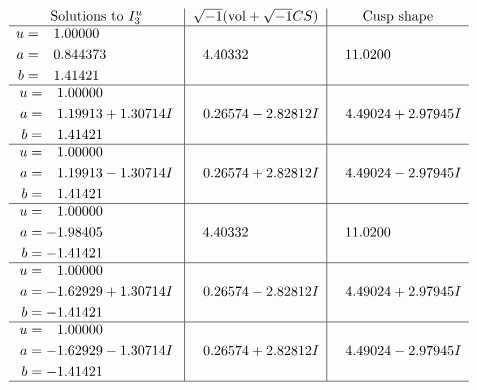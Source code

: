 \documentclass[1p]{elsarticle_modified}
\theoremstyle{definition}
\newcommand{\I}{\sqrt{-1}}
\begin{document}
$$\begin{array}{c|c|c}  
\text{Solutions to }I^u_{3}& \I (\text{vol} + \sqrt{-1}CS) & \text{Cusp shape}\\
 \hline 
\begin{aligned}
u &= \phantom{-}1.00000\phantom{ +0.000000I} \\
a &= \phantom{-}0.844373\phantom{ +0.000000I} \\
b &= \phantom{-}1.41421\phantom{ +0.000000I}\end{aligned}
 & \phantom{-}4.40332\phantom{ +0.000000I} & \phantom{-}11.0200\phantom{ +0.000000I} \\ \hline\begin{aligned}
u &= \phantom{-}1.00000\phantom{ +0.000000I} \\
a &= \phantom{-}1.19913 + 1.30714 I \\
b &= \phantom{-}1.41421\phantom{ +0.000000I}\end{aligned}
 & \phantom{-}0.26574 - 2.82812 I & \phantom{-}4.49024 + 2.97945 I \\ \hline\begin{aligned}
u &= \phantom{-}1.00000\phantom{ +0.000000I} \\
a &= \phantom{-}1.19913 - 1.30714 I \\
b &= \phantom{-}1.41421\phantom{ +0.000000I}\end{aligned}
 & \phantom{-}0.26574 + 2.82812 I & \phantom{-}4.49024 - 2.97945 I \\ \hline\begin{aligned}
u &= \phantom{-}1.00000\phantom{ +0.000000I} \\
a &= -1.98405\phantom{ +0.000000I} \\
b &= -1.41421\phantom{ +0.000000I}\end{aligned}
 & \phantom{-}4.40332\phantom{ +0.000000I} & \phantom{-}11.0200\phantom{ +0.000000I} \\ \hline\begin{aligned}
u &= \phantom{-}1.00000\phantom{ +0.000000I} \\
a &= -1.62929 + 1.30714 I \\
b &= -1.41421\phantom{ +0.000000I}\end{aligned}
 & \phantom{-}0.26574 - 2.82812 I & \phantom{-}4.49024 + 2.97945 I \\ \hline\begin{aligned}
u &= \phantom{-}1.00000\phantom{ +0.000000I} \\
a &= -1.62929 - 1.30714 I \\
b &= -1.41421\phantom{ +0.000000I}\end{aligned}
 & \phantom{-}0.26574 + 2.82812 I & \phantom{-}4.49024 - 2.97945 I\\
 \hline 
 \end{array}$$\newpage
\end{document}
